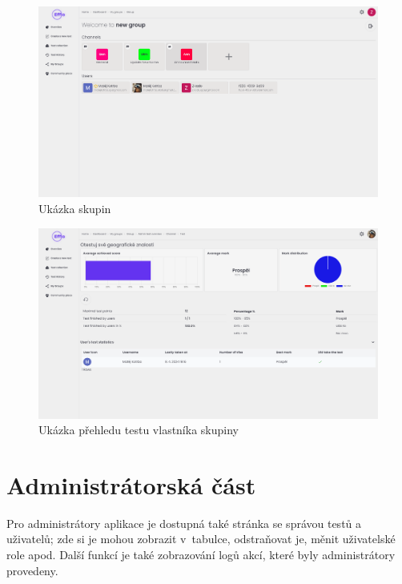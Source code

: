 \documentclass[12pt, a4paper,
openright
]{report}
\begin{document}
\begin{figure}[H]
	\centering %
	\includegraphics[width=0.9\linewidth]{image/groups.png} 
	\caption{Ukázka skupin} %
	\label{fig:groups} %
\end{figure}

\begin{figure}[H]
	\centering %
	\includegraphics[width=0.9\linewidth]{image/group-admin.png} 
	\caption{Ukázka přehledu testu vlastníka skupiny} %
	\label{fig:group-admin} %
\end{figure}

\section{Administrátorská část}
Pro administrátory aplikace je dostupná také stránka se správou testů a uživatelů; zde si je mohou zobrazit v~tabulce, odstraňovat je,  měnit uživatelské role apod. Další funkcí je také zobrazování logů akcí, které byly administrátory provedeny.
\end{document}
